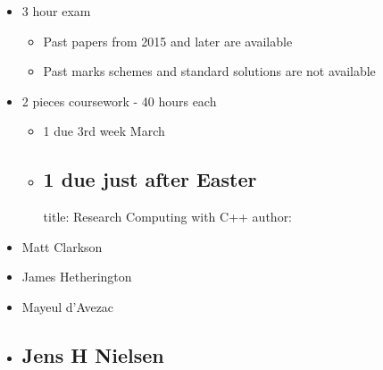\begin{itemize}
\item
  3 hour exam

  \begin{itemize}
  \itemsep1pt\parskip0pt
  \item
    Past papers from 2015 and later are available
  \item
    Past marks schemes and standard solutions are not available
  \end{itemize}
\item
  2 pieces coursework - 40 hours each

  \begin{itemize}
  \item
    1 due 3rd week March
  \item
    \subsection{1 due just after Easter}\label{due-just-after-easter}

    title: Research Computing with C++ author:
  \end{itemize}
\item
  Matt Clarkson
\item
  James Hetherington
\item
  Mayeul d'Avezac
\item
  \subsection{Jens H Nielsen}\label{jens-h-nielsen}
\end{itemize}
